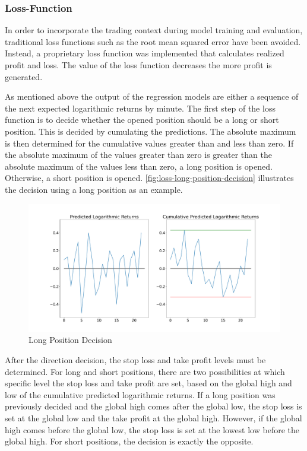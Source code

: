 \subsubsection{Loss-Function}
\label{chap:regression-loss}

In order to incorporate the trading context during model training and evaluation, traditional loss functions such as the root mean squared error have been avoided.
Instead, a proprietary loss function was implemented that calculates realized profit and loss.
The value of the loss function decreases the more profit is generated.

As mentioned above the output of the regression models are either a sequence of the next expected logarithmic returns by minute.
The first step of the loss function is to decide whether the opened position should be a long or short position.
This is decided by cumulating the predictions.
The absolute maximum is then determined for the cumulative values greater than and less than zero.
If the absolute maximum of the values greater than zero is greater than the absolute maximum of the values less than zero, a long position is opened.
Otherwise, a short position is opened.
\autoref{fig:loss-long-position-decision} illustrates the decision using a long position as an example.

\begin{figure}[H]
    \centering
    \includegraphics[width=\textwidth]{images/models/loss_direction}
    \caption{Long Position Decision}
    \label{fig:loss-long-position-decision}
\end{figure}

After the direction decision, the stop loss and take profit levels must be determined.
For long and short positions, there are two possibilities at which specific level the stop loss and take profit are set, based on the global high and low of the cumulative predicted logarithmic returns.
If a long position was previously decided and the global high comes after the global low, the stop loss is set at the global low and the take profit at the global high.
However, if the global high comes before the global low, the stop loss is set at the lowest low before the global high.
For short positions, the decision is exactly the opposite.

